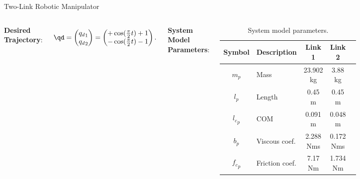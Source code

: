 \documentclass[8pt, aspectratio=169, handout]{beamer}
\begin{document}
\begin{frame}{\insertsubsectionhead}{Two-Link Robotic Manipulator}
\begin{columns}
        \textbf{Desired Trajectory}:

        \begin{equation}
          \qd
          =
          \begin{pmatrix}
              {q_d}_1\\
              {q_d}_2
          \end{pmatrix}
          = 
          \begin{pmatrix}
              +\cos(
                  \tfrac{\pi}{2}t
              ) + 1 \\
              -\cos(
                  \tfrac{\pi}{2}t
              ) - 1 
          \end{pmatrix}
          .
      \end{equation}

      \textbf{System Model Parameters}:

      \begin{table}
        \renewcommand{\arraystretch}{1.3}
        \caption{System model parameters.}
        \centering
        \begin{tabular}{c m{5em} c c c }
        \hline
        \textbf{Symbol} & \textbf{Description} & \textbf{Link 1} & \textbf{Link 2} \\
        \hline
        \hline 
        $m_p$ & Mass & 23.902 kg & 3.88 kg \\
        \hline
        $l_p$  & Length & 0.45 m & 0.45 m \\
        \hline
        ${l_c}_p$ & COM & 0.091 m & 0.048 m \\
        \hline
        $b_p$   & Viscous coef. &  2.288 Nms & 0.172 Nms \\
        \hline
        ${f_c}_p$  & Friction coef. & 7.17 Nm & 1.734 Nm \\
        \hline
        \end{tabular}
        \label{table: system parameters}
      \end{table}

    \end{columns}

\end{frame}
\end{document}
